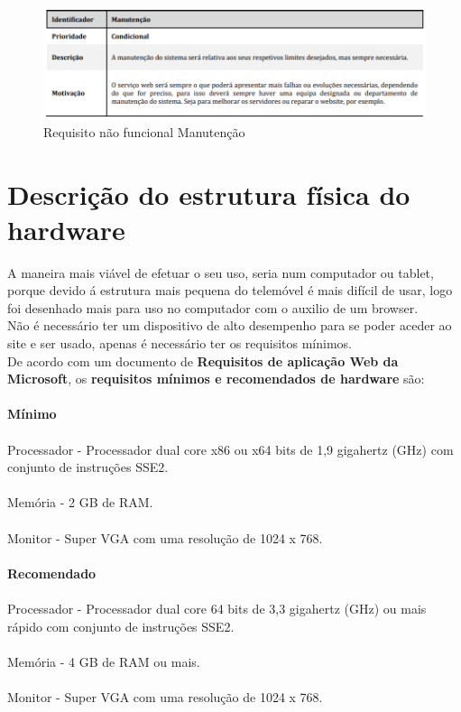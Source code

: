 \begin{figure}[H]
	\centering
	\includegraphics[width=15cm]{requisito_nao_funcional6}
	\caption{Requisito não funcional Manutenção}
	\label{fig:requisitonaofuncional6}
\end{figure}

\section{Descrição do estrutura física do hardware}
A maneira mais viável de efetuar o seu uso, seria num computador ou tablet, porque devido á estrutura mais pequena do telemóvel é mais difícil de usar, logo foi desenhado mais para uso no computador com o auxilio de um browser. \\
Não é necessário ter um dispositivo de alto desempenho para se poder aceder ao site e ser usado, apenas é necessário ter os requisitos mínimos.\\
De acordo com um documento de \textbf{Requisitos de aplicação Web da Microsoft}, os \textbf{requisitos mínimos e recomendados de hardware} são:\\
\\ \textbf{Mínimo}\\
\\Processador - Processador dual core x86 ou x64 bits de 1,9 gigahertz (GHz) com conjunto de instruções SSE2.\\
\\Memória - 2 GB de RAM. \\
\\Monitor - Super VGA com uma resolução de 1024 x 768. \\
\\ \textbf{Recomendado}\\
\\Processador - Processador dual core 64 bits de 3,3 gigahertz (GHz) ou mais rápido com conjunto de instruções SSE2.\\
\\Memória - 4 GB de RAM ou mais.\\
\\Monitor - 	Super VGA com uma resolução de 1024 x 768.\\
